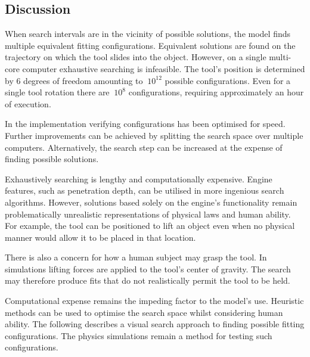 \documentclass[11]{article}
\begin{document}
\subsection{Discussion}
When search intervals are in the vicinity of possible solutions, the model finds multiple equivalent fitting configurations.
Equivalent solutions are found on the trajectory on which the tool slides into the object.
However, on a single multi-core computer exhaustive searching is infeasible. 
The tool's position is determined by 6 degrees of freedom amounting to $~10^{12}$ possible configurations. 
Even for a single tool rotation there are $~10^8$ configurations, requiring approximately an hour of execution. 

In the implementation verifying configurations has been optimised for speed.
Further improvements can be achieved by splitting the search space over multiple computers.
Alternatively, the search step can be increased at the expense of finding possible solutions. 

Exhaustively searching is lengthy and computationally expensive.
Engine features, such as penetration depth, can be utilised in more ingenious search algorithms.
However, solutions based solely on the engine's functionality remain problematically unrealistic representations of physical laws and human ability.
For example, the tool can be positioned to lift an object even when no physical manner would allow it to be placed in that location.  

There is also a concern for how a human subject may grasp the tool.
In simulations lifting forces are applied to the tool's center of gravity.
The search may therefore produce fits that do not realistically permit the tool to be held.

Computational expense remains the impeding factor to the model's use. 
Heuristic methods can be used to optimise the search space whilst considering human ability.
The following describes a visual search approach to finding possible fitting configurations. 
The physics simulations remain a method for testing such configurations. 

\printbibliography
\end{document}
